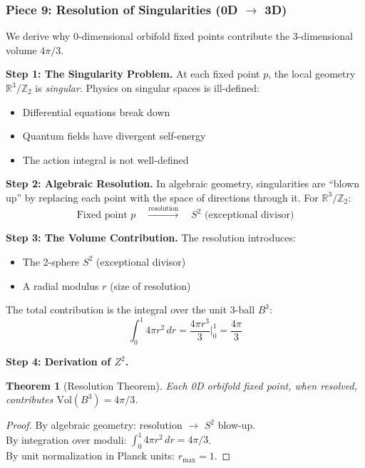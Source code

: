 \documentclass[12pt,a4paper]{article}
\newtheorem{theorem}{Theorem}[section]
\newcommand{\Zsq}{Z^2}
\begin{document}
\subsubsection{Piece 9: Resolution of Singularities (0D $\to$ 3D)}

We derive why 0-dimensional orbifold fixed points contribute the 3-dimensional volume $4\pi/3$.

\textbf{Step 1: The Singularity Problem.}
At each fixed point $p$, the local geometry $\mathbb{R}^3/\mathbb{Z}_2$ is \textit{singular}. Physics on singular spaces is ill-defined:
\begin{itemize}[itemsep=0pt]
    \item Differential equations break down
    \item Quantum fields have divergent self-energy
    \item The action integral is not well-defined
\end{itemize}

\textbf{Step 2: Algebraic Resolution.}
In algebraic geometry, singularities are ``blown up'' by replacing each point with the space of directions through it. For $\mathbb{R}^3/\mathbb{Z}_2$:
\begin{equation}
\text{Fixed point } p \quad \xrightarrow{\text{resolution}} \quad S^2 \text{ (exceptional divisor)}
\end{equation}

\textbf{Step 3: The Volume Contribution.}
The resolution introduces:
\begin{itemize}[itemsep=0pt]
    \item The 2-sphere $S^2$ (exceptional divisor)
    \item A radial modulus $r$ (size of resolution)
\end{itemize}
The total contribution is the integral over the unit 3-ball $B^3$:
\begin{equation}
\int_0^1 4\pi r^2 \, dr = \frac{4\pi r^3}{3}\Big|_0^1 = \boxed{\frac{4\pi}{3}}
\end{equation}

\textbf{Step 4: Derivation of $\Zsq$.}
\begin{theorem}[Resolution Theorem]
Each 0D orbifold fixed point, when resolved, contributes $\text{Vol}(B^3) = 4\pi/3$.
\end{theorem}
\begin{proof}
By algebraic geometry: resolution $\to$ $S^2$ blow-up. \\
By integration over moduli: $\int_0^1 4\pi r^2 \, dr = 4\pi/3$. \\
By unit normalization in Planck units: $r_{\max} = 1$.
\end{proof}
\end{document}
